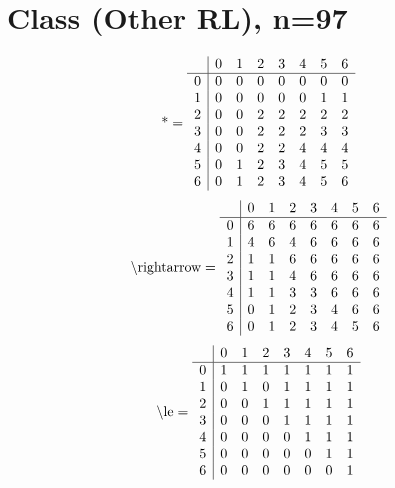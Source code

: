 \documentclass[11pt]{article}
\begin{document}
\section{Class (Other RL), n=97}
\[\text{*} = 
\begin{array}{r | r r r r r r r}
 & 0 & 1 & 2 & 3 & 4 & 5 & 6 \\ \hline
0 & 0 & 0 & 0 & 0 & 0 & 0 & 0 \\
1 & 0 & 0 & 0 & 0 & 0 & 1 & 1 \\
2 & 0 & 0 & 2 & 2 & 2 & 2 & 2 \\
3 & 0 & 0 & 2 & 2 & 2 & 3 & 3 \\
4 & 0 & 0 & 2 & 2 & 4 & 4 & 4 \\
5 & 0 & 1 & 2 & 3 & 4 & 5 & 5 \\
6 & 0 & 1 & 2 & 3 & 4 & 5 & 6 \\
\end{array}
\]
\[\text{\textbackslash rightarrow} = 
\begin{array}{r | r r r r r r r}
 & 0 & 1 & 2 & 3 & 4 & 5 & 6 \\ \hline
0 & 6 & 6 & 6 & 6 & 6 & 6 & 6 \\
1 & 4 & 6 & 4 & 6 & 6 & 6 & 6 \\
2 & 1 & 1 & 6 & 6 & 6 & 6 & 6 \\
3 & 1 & 1 & 4 & 6 & 6 & 6 & 6 \\
4 & 1 & 1 & 3 & 3 & 6 & 6 & 6 \\
5 & 0 & 1 & 2 & 3 & 4 & 6 & 6 \\
6 & 0 & 1 & 2 & 3 & 4 & 5 & 6 \\
\end{array}
\]
\[\text{\textbackslash le} = 
\begin{array}{r | r r r r r r r}
 & 0 & 1 & 2 & 3 & 4 & 5 & 6 \\ \hline
0 & 1 & 1 & 1 & 1 & 1 & 1 & 1 \\
1 & 0 & 1 & 0 & 1 & 1 & 1 & 1 \\
2 & 0 & 0 & 1 & 1 & 1 & 1 & 1 \\
3 & 0 & 0 & 0 & 1 & 1 & 1 & 1 \\
4 & 0 & 0 & 0 & 0 & 1 & 1 & 1 \\
5 & 0 & 0 & 0 & 0 & 0 & 1 & 1 \\
6 & 0 & 0 & 0 & 0 & 0 & 0 & 1 \\
\end{array}
\]
\end{document}
